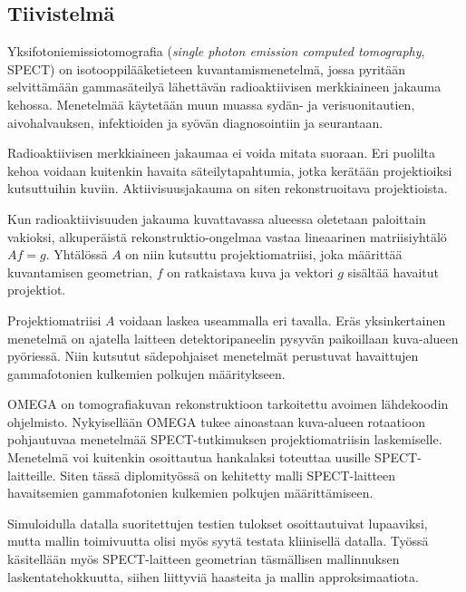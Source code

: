 \begin{titlepage}
    \section*{Tiivistelmä}
    Yksifotoniemissiotomografia (\textit{single photon emission computed tomography}, SPECT) on isotooppilääketieteen kuvantamismenetelmä, jossa pyritään selvittämään gammasäteilyä lähettävän radioaktiivisen merkkiaineen jakauma kehossa. Menetelmää käytetään muun muassa sydän- ja verisuonitautien, aivohalvauksen, infektioiden ja syövän diagnosointiin ja seurantaan.

    Radioaktiivisen merkkiaineen jakaumaa ei voida mitata suoraan. Eri puolilta kehoa voidaan kuitenkin havaita säteilytapahtumia, jotka kerätään projektioiksi kutsuttuihin kuviin. Aktiivisuusjakauma on siten rekonstruoitava projektioista.

    Kun radioaktiivisuuden jakauma kuvattavassa alueessa oletetaan paloittain vakioksi, alkuperäistä rekonstruktio-ongelmaa vastaa lineaarinen matriisiyhtälö $Af=g$. Yhtälössä $A$ on niin kutsuttu projektiomatriisi, joka määrittää kuvantamisen geometrian, $f$ on ratkaistava kuva ja vektori $g$ sisältää havaitut projektiot.

    Projektiomatriisi $A$ voidaan laskea useammalla eri tavalla. Eräs yksinkertainen menetelmä on ajatella laitteen detektoripaneelin pysyvän paikoillaan kuva-alueen pyöriessä. Niin kutsutut sädepohjaiset menetelmät perustuvat havaittujen gammafotonien kulkemien polkujen määritykseen.

    OMEGA on tomografiakuvan rekonstruktioon tarkoitettu avoimen lähdekoodin ohjelmisto. Nykyisellään OMEGA tukee ainoastaan kuva-alueen rotaatioon pohjautuvaa menetelmää SPECT-tutkimuksen projektiomatriisin laskemiselle. Menetelmä voi kuitenkin osoittautua hankalaksi toteuttaa uusille SPECT-laitteille. Siten tässä diplomityössä on kehitetty malli SPECT-laitteen havaitsemien gammafotonien kulkemien polkujen määrittämiseen.

    Simuloidulla datalla suoritettujen testien tulokset osoittautuivat lupaaviksi, mutta mallin toimivuutta olisi myös syytä testata kliinisellä datalla. Työssä käsitellään myös SPECT-laitteen geometrian täsmällisen mallinnuksen laskentatehokkuutta, siihen liittyviä haasteita ja mallin approksimaatiota.
\end{titlepage}